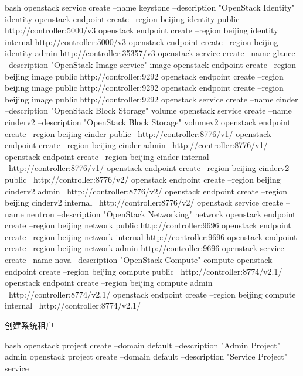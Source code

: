 \begin{long-block}{bash}
openstack service create --name keystone --description "OpenStack Identity" identity
openstack endpoint create --region beijing identity public http://controller:5000/v3
openstack endpoint create --region beijing identity internal http://controller:5000/v3
openstack endpoint create --region beijing identity admin http://controller:35357/v3
openstack service create --name glance --description "OpenStack Image service" image
openstack endpoint create --region beijing  image public http://controller:9292
openstack endpoint create --region beijing  image public http://controller:9292
openstack endpoint create --region beijing  image public http://controller:9292
openstack service create --name cinder --description "OpenStack Block Storage" volume
openstack service create --name cinderv2 --description "OpenStack Block Storage" volumev2
openstack endpoint create --region beijing cinder public \
    http://controller:8776/v1/%
openstack endpoint create --region beijing cinder admin \
    http://controller:8776/v1/%
openstack endpoint create --region beijing cinder internal \
    http://controller:8776/v1/%
openstack endpoint create --region beijing cinderv2 public \
    http://controller:8776/v2/%
openstack endpoint create --region beijing cinderv2 admin \
    http://controller:8776/v2/%
openstack endpoint create --region beijing cinderv2 internal \
    http://controller:8776/v2/%
openstack service create --name neutron  --description "OpenStack Networking" network
openstack endpoint create --region beijing network public http://controller:9696
openstack endpoint create --region beijing network internal http://controller:9696
openstack endpoint create --region beijing network admin http://controller:9696
openstack service create --name nova --description "OpenStack Compute" compute 
openstack endpoint create --region beijing compute public \
    http://controller:8774/v2.1/%
openstack endpoint create --region beijing compute admin \
    http://controller:8774/v2.1/%
openstack endpoint create --region beijing compute internal \
    http://controller:8774/v2.1/%
\end{long-block}

创建系统租户

\begin{code-block}{bash}
openstack project create --domain default --description "Admin Project" admin 
openstack project create --domain default --description "Service Project" service
\end{code-block}


